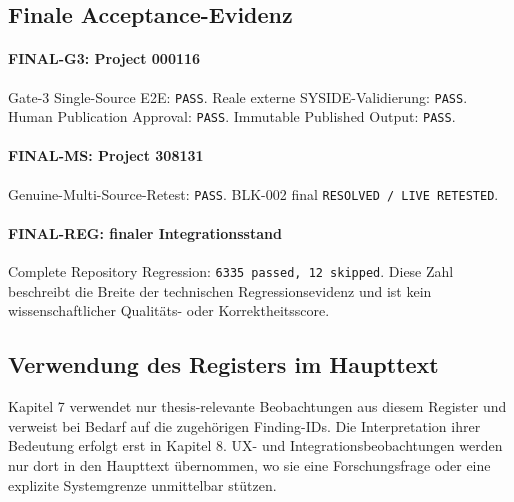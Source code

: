 \subsection{Finale Acceptance-Evidenz}

\paragraph{FINAL-G3: Project 000116}
Gate-3 Single-Source E2E: \texttt{PASS}. Reale externe SYSIDE-Validierung:
\texttt{PASS}. Human Publication Approval: \texttt{PASS}. Immutable Published
Output: \texttt{PASS}.

\paragraph{FINAL-MS: Project 308131}
Genuine-Multi-Source-Retest: \texttt{PASS}. BLK-002 final
\texttt{RESOLVED / LIVE RETESTED}.

\paragraph{FINAL-REG: finaler Integrationsstand}
Complete Repository Regression: \texttt{6335 passed, 12 skipped}. Diese Zahl
beschreibt die Breite der technischen Regressionsevidenz und ist kein
wissenschaftlicher Qualitäts- oder Korrektheitsscore.

\subsection{Verwendung des Registers im Haupttext}

Kapitel 7 verwendet nur thesis-relevante Beobachtungen aus diesem Register und
verweist bei Bedarf auf die zugehörigen Finding-IDs. Die Interpretation ihrer
Bedeutung erfolgt erst in Kapitel 8. UX- und Integrationsbeobachtungen werden nur
dort in den Haupttext übernommen, wo sie eine Forschungsfrage oder eine explizite
Systemgrenze unmittelbar stützen.

